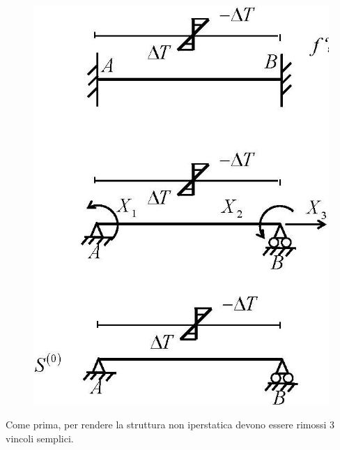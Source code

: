 \documentclass{article}
\begin{document}
\begin{adjustwidth}{2in}{}
\begin{figure}[H]
	\centering
	\includegraphics[width=0.4\linewidth]{"immagini/1.PARTE8_Pagina_59"}	
\end{figure}
		
		Come prima, per rendere la struttura non iperstatica devono essere rimossi 3 vincoli semplici. 
		

\end{adjustwidth}
\end{document}
